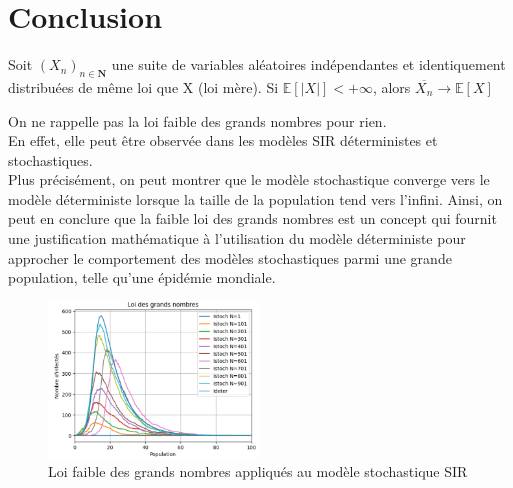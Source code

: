 \chapter{Conclusion}

\begin{theorem}
 Soit $(X_n)_{n \in \boldsymbol{N}}$ une suite de variables aléatoires indépendantes et identiquement distribuées de même loi que X (loi mère). Si $\mathbb{E}[|X|] < +\infty$, alors $\overline{X_n} \rightarrow \mathbb{E}[X]$
\end{theorem}


On ne rappelle pas la loi faible des grands nombres pour rien.\\
En effet, elle peut être observée dans les modèles SIR déterministes et stochastiques.\\
Plus précisément, on peut montrer que le modèle stochastique converge vers le modèle déterministe lorsque la taille de la population tend vers l'infini. Ainsi, on peut en conclure que la faible loi des grands nombres est un concept qui fournit une justification mathématique à l'utilisation du modèle déterministe pour approcher le comportement des modèles stochastiques parmi une grande population, telle qu'une épidémie mondiale.

\begin{figure}[h]
\centering
\includegraphics[width=0.5\textwidth]{figs/sir_loi_grands_nombres.png}
\caption{Loi faible des grands nombres appliqués au modèle stochastique SIR}
\label{fig:loi_grands_nombres}
\end{figure}